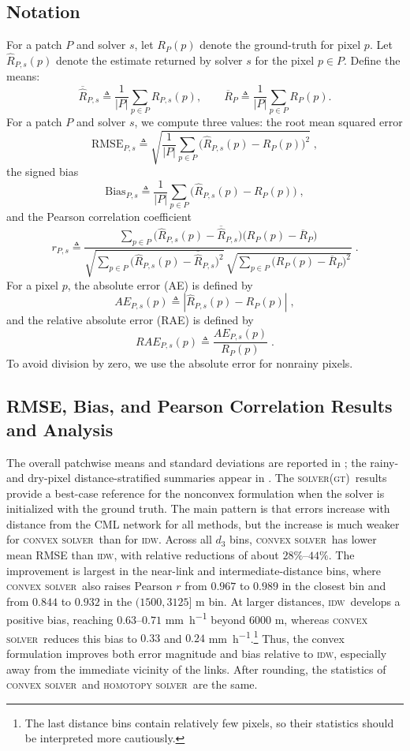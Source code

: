 \documentclass[a4paper,fleqn]{cas-sc}
\DeclareRobustCommand{\IDW}{\textsc{idw}}
\DeclareRobustCommand{\solverGT}{\textsc{solver(gt)}}
\DeclareRobustCommand{\solverConvex}{\textsc{convex solver}}
\DeclareRobustCommand{\solverHomotopy}{\textsc{homotopy solver}}
\DeclareRobustCommand{\ConvexSolver}{\solverConvex}
\DeclareRobustCommand{\Homotopy}{\solverHomotopy}
\begin{document}
\subsection{Notation}
For a patch $P$ and solver $s$, let
$R_P(p)$ denote the ground-truth for pixel $p$.
Let $\widehat{R}_{P,s}(p)$ denote the estimate returned by solver $s$ for the pixel $p\in P$.
Define the means:
\[
  \overline{\widehat{R}}_{P,s}\triangleq \frac{1}{|P|}\sum_{p\in P}\widehat{R}_{P,s}(p),
  \qquad
  \overline{R}_P\triangleq \frac{1}{|P|}\sum_{p\in P}R_P(p).
\]
For a patch $P$ and solver $s$, we  compute three values: the root mean squared error
\[
  \mathrm{RMSE}_{P,s}\triangleq
  \sqrt{\frac{1}{|P|}\sum_{p\in P}\bigl(\widehat{R}_{P,s}(p)-R_P(p)\bigr)^2}\;,
\]
the signed bias
\[
  \mathrm{Bias}_{P,s}\triangleq
  \frac{1}{|P|}\sum_{p\in P}\bigl(\widehat{R}_{P,s}(p)-R_P(p)\bigr)\;,
\]
and the Pearson correlation coefficient
\[
  r_{P,s}\triangleq
  \frac{\sum_{p\in P}\bigl(\widehat{R}_{P,s}(p)-\overline{\widehat{R}}_{P,s}\bigr)\bigl(R_P(p)-\overline{R}_P\bigr)}
  {\sqrt{\sum_{p\in P}\bigl(\widehat{R}_{P,s}(p)-\overline{\widehat{R}}_{P,s}\bigr)^2}\,
    \sqrt{\sum_{p\in P}\bigl(R_P(p)-\overline{R}_P\bigr)^2}}\;.
\]
For a pixel $p$, the absolute error (AE) is defined by
\[
  AE_{P,s}(p) \triangleq |\widehat{R}_{P,s}(p)-R_P(p)|\;,
\]
and the relative absolute error (RAE) is defined by
\[
  RAE_{P,s}(p) \triangleq \frac{AE_{P,s}(p)}{R_P(p)}\;.
\]
To avoid division by zero, we use the absolute error for nonrainy pixels.
\subsection{RMSE, Bias, and Pearson Correlation Results and Analysis}


The overall patchwise means and standard deviations are reported in ; the rainy- and dry-pixel distance-stratified summaries appear in .
The \solverGT\ results provide a best-case reference for the nonconvex formulation when the solver is initialized with the ground truth.
%
The main pattern is that errors increase with distance from the CML network for all methods, but the increase is much weaker for \ConvexSolver\ than for \IDW. Across all $d_3$ bins, \ConvexSolver\ has lower mean RMSE than \IDW, with relative reductions of about $28\%$--$44\%$. The improvement is largest in the near-link and intermediate-distance bins, where \ConvexSolver\ also raises Pearson $r$ from $0.967$ to $0.989$ in the closest bin and from $0.844$ to $0.932$ in the $(1500,3125]$ m bin. At larger distances, \IDW\ develops a positive bias, reaching $0.63$--$0.71$ \si{\milli\meter\per\hour} beyond $6000$ m, whereas \ConvexSolver\ reduces this bias to $0.33$ and $0.24$ \si{\milli\meter\per\hour}.\footnote{The last distance bins contain relatively few pixels, so their statistics should be interpreted more cautiously.} Thus, the convex formulation improves both error magnitude and bias relative to \IDW, especially away from the immediate vicinity of the links.
After rounding, the statistics of \ConvexSolver\ and \Homotopy\ are the same.
\end{document}
